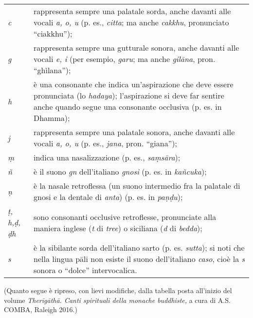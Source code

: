 {\setlength{\parindent}{0pt}%
\renewcommand\arraystretch{1.3}%
\fontsize{10}{14}\selectfont

\begin{tabular}{p{10mm} p{90mm}@{}}

  \emph{c} & rappresenta sempre una palatale sorda, anche davanti alle vocali \emph{a, o, u} (p. es., \emph{citta}; ma anche \emph{cakkhu}, pronunciato “ciakkhu”); \\

  \emph{g} & rappresenta sempre una gutturale sonora, anche davanti alle vocali \emph{e, i} (per esempio, \emph{garu}; ma anche \emph{gilāna}, pron. “ghìlana”); \\

  \emph{h} & è una consonante che indica un’aspirazione che deve essere pronunciata (lo \emph{hadaya}); l’aspirazione si deve far sentire anche quando segue una consonante occlusiva (p. es. in Dhamma); \\

  \emph{j} & rappresenta sempre una palatale sonora, anche davanti alle vocali \emph{a, o, u} (p. es., \emph{jana}, pron. “giana”); \\

  \emph{ṃ} & indica una nasalizzazione (p. es., \emph{saṃsāra}); \\

  \emph{ñ} & è il suono \emph{gn} dell’italiano \emph{gnosi} (p. es. in \emph{kañcuka}); \\

  \emph{ṇ} & è la nasale retroﬂessa (un suono intermedio fra la palatale di gnosi e la dentale di \emph{anta}) (p. es. in \emph{paṇḍu}); \\

  \emph{ṭ, h,\newline ḍ, ḍh} & sono consonanti occlusive retroflesse, pronunciate alla maniera inglese (\emph{t} di \emph{tree}) o siciliana (\emph{d} di \emph{bedda}); \\

  \emph{s} & è la sibilante sorda dell’italiano sarto (p. es. \emph{sutta}); si noti che nella lingua pāli non esiste il suono dell’italiano \emph{caso}, cioè la \emph{s} sonora o “dolce” intervocalica. \\

\end{tabular}

}

\vfill

\noindent
{\footnotesize
  (Quanto segue è ripreso, con lievi modifiche, dalla tabella posta
  all’inizio del volume \emph{Therīgāthā. Canti spirituali della monache
    buddhiste,} a cura di A.S. COMBA, Raleigh 2016.)
\par}

